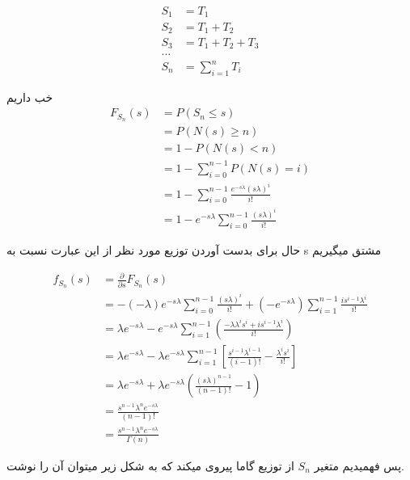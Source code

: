 \documentclass{article}[12pt]
\begin{document}
\begin{equation}
\begin{split}
S_1 &= T_1 \\
S_2 &= T_1 + T_2 \\
S_3 &= T_1 + T_2 + T_3 \\ 
... \\
S_n &= \sum_{i=1}^{n} T_i
\end{split}
\end{equation}

خب داریم
\begin{equation}
\begin{split}
F_{S_n}(s) &= P(S_n \leq s) 
\\
&= P(N(s) \geq n)
\\ 
&= 1 - P(N(s) < n) 
\\
&= 1 - \sum_{i=0}^{n-1} P(N(s)=i) 
\\
&= 1-  \sum_{i=0}^{n-1}
\frac{e^{-s\lambda}(s\lambda)^i}{i!} 
\\
&= 1- e^{-s\lambda} \sum_{i=0}^{n-1}
\frac{(s\lambda)^i}{i!} 
\end{split}
\end{equation}

حال برای بدست آوردن توزیع مورد نظر از این عبارت نسبت به s مشتق میگیریم 

\begin{equation}
\begin{split}
f_{S_n}(s) &= \frac{\partial}{\partial s} F_{S_n}(s) \\
&= -(-\lambda) e^{-s\lambda} 
\sum_{i=0}^{n-1}
\frac{(s\lambda)^i}{i!} +
(-e^{-s\lambda}) \sum_{i=1}^{n-1} 
\frac{i s^{i-1} \lambda^i}{i!} 
\\
&= 
\lambda e^{-s\lambda} -  
 e^{-s \lambda} \sum_{i=1}^{n-1} \left(
\frac{ -\lambda \lambda^i s^i + i s^{i-1} \lambda^i}{i!} \right)
\\
&=
\lambda e^{-s\lambda} - 
\lambda e^{-s \lambda} \sum_{i=1}^{n-1} \left[
\frac{  s^{i-1} \lambda^{i-1} }{(i-1)!} - 
\frac{\lambda^i s^i}{i!}\right]  
\\
&=
 \lambda e^{-s\lambda} +
\lambda e^{-s \lambda} 
\left(
\frac{(s\lambda)^{n-1}}{(n-1)!} - 1
\right)
\\
&= 
\frac{s^{n-1} \lambda^n e^{-s\lambda}}{(n-1)!} 
\\
&= 
\frac{s^{n-1} \lambda^n e^{-s\lambda}}{\Gamma(n)}
\end{split} 
\end{equation}

پس فهمیدیم متغیر 
$S_n$
از توزیع گاما پیروی میکند که به شکل زیر میتوان آن را نوشت. 
\end{document}
